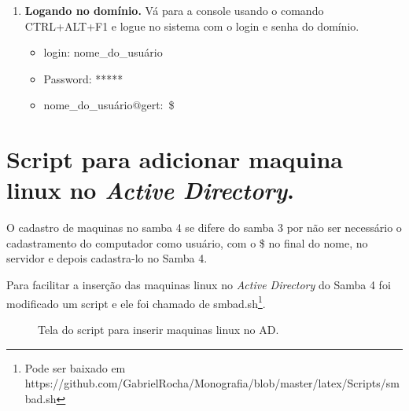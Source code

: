\begin{enumerate}
	\item \textbf{Logando no domínio.}
		Vá para a console usando o comando CTRL+ALT+F1 e logue no sistema com o login e senha do domínio.

		\begin{itemize}
			\item {login: nome\_do\_usuário}
			\item {Password: *****}
			\item {nome\_do\_usuário$@$gert:~\$}
		\end{itemize}

\end{enumerate}

\section{Script para adicionar maquina linux no \textit{Active Directory}.}

O cadastro de maquinas no samba 4 se difere do samba 3 por não ser necessário o cadastramento do computador como usuário, com o \$ no final do nome, no servidor e depois cadastra-lo no Samba 4.

Para facilitar a inserção das maquinas linux no \textit{Active Directory} do Samba 4 foi modificado um script e ele foi chamado de smbad.sh\footnote[4]{Pode ser baixado em https://github.com/GabrielRocha/Monografia/blob/master/latex/Scripts/smbad.sh}. 

\begin{figure}[ht]
   	\centering
   	\caption{Tela do script para inserir maquinas linux no AD.}
    \label{smbad}
\end{figure}



